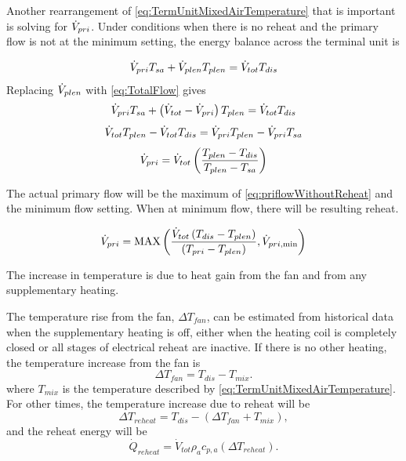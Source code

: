 Another rearrangement of \ref{eq:TermUnitMixedAirTemperature} that is important is
solving for \(\dot{V}_{pri}\). Under conditions when there is no reheat and the
primary flow is not at the minimum setting, the energy balance across the
terminal unit is

\begin{equation}
    \dot{V}_{pri} T_{sa} + \dot{V}_{plen} T_{plen} = \dot{V}_{tot} T_{dis}
\end{equation}
Replacing \(\dot{V}_{plen}{} \) with  \ref{eq:TotalFlow} gives
\begin{equation}
    \dot{V}_{pri} T_{sa} +  \left(\dot{V}_{tot} - \dot{V}_{pri} \right)  T_{plen} = \dot{V}_{tot} T_{dis}
\end{equation}
\begin{equation}
 \dot{V}_{tot} T_{plen}  -   \dot{V}_{tot} T_{dis}  = \dot{V}_{pri}  T_{plen}  - \dot{V}_{pri} T_{sa}
\end{equation}
\begin{equation}\label{eq:priflowWithoutReheat}
   \dot{V}_{pri} = \dot{V}_{tot} \left( \frac{T_{plen} - T_{dis} }{T_{plen} - T_{sa}} \right)
\end{equation}

The actual primary flow will be the maximum of 
\ref{eq:priflowWithoutReheat} and the minimum flow setting. When at minimum
flow, there will be resulting reheat.


\begin{equation} \label{eq:PrimaryFlowInTerminalUnit}
    \dot{V}_{pri} = \text{MAX}\left(\frac{\dot{V}_{tot} \left(T_{dis} - T_{plen} \right)}{\left(T_{pri} - T_{plen} \right)}, \dot{V}_{pri, \text{min}} \right)
\end{equation}


The increase in temperature is due to heat gain from the fan and from
any supplementary heating.

The temperature rise from the fan, \(\Delta T_{fan}\), can be estimated from
historical data when the supplementary heating is off, either when the heating
coil is completely closed or all stages of electrical reheat are inactive. If
there is no other heating, the temperature increase from the fan is
%
\begin{equation}
\Delta {T_{fan}} = {T_{dis}} - {T_{mix}}.
\end{equation}
where \(T_{mix}\) is the temperature described by 
\ref{eq:TermUnitMixedAirTemperature}.
%
For other times, the temperature increase due to reheat will be
%
\begin{equation}
\Delta {T_{reheat}} = {T_{dis}} - \left( {\Delta {T_{fan}} + {T_{mix}}} \right),
\end{equation}
%
and the reheat energy will be
%
\begin{equation}
{\dot Q_{reheat}} = {\dot V_{tot}}{\rho _a}{c_{p,a}}\left( {\Delta {T_{reheat}}} \right).
\end{equation}

